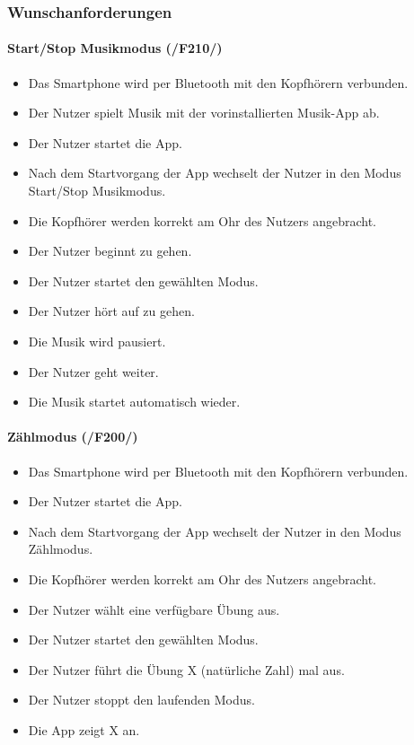 \documentclass[a4paper,12pt]{article}
\begin{document}
    \subsubsection{Wunschanforderungen}
      \paragraph{Start/Stop Musikmodus (/F210/)}
      \begin{itemize}
        \item[] Das Smartphone wird per Bluetooth mit den Kopfhörern verbunden.
        \item[] Der Nutzer spielt Musik mit der vorinstallierten Musik-App ab.
        \item[] Der Nutzer startet die App.
        \item[] Nach dem Startvorgang der App wechselt der Nutzer in den Modus \glqq Start/Stop Musikmodus\grqq .
        \item[] Die Kopfhörer werden korrekt am Ohr des Nutzers angebracht.
        \item[] Der Nutzer beginnt zu gehen.
        \item[] Der Nutzer startet den gewählten Modus.
        \item[] Der Nutzer hört auf zu gehen.
        \item[] Die Musik wird pausiert.
        \item[] Der Nutzer geht weiter.
        \item[] Die Musik startet automatisch wieder.
      \end{itemize}
      
      \paragraph{Zählmodus (/F200/)}
      \begin{itemize}
        \item[] Das Smartphone wird per Bluetooth mit den Kopfhörern verbunden.
        \item[] Der Nutzer startet die App.
        \item[] Nach dem Startvorgang der App wechselt der Nutzer in den Modus \glqq Zählmodus\grqq .
        \item[] Die Kopfhörer werden korrekt am Ohr des Nutzers angebracht.
        \item[] Der Nutzer wählt eine verfügbare Übung aus. 
        \item[] Der Nutzer startet den gewählten Modus.
        \item[] Der Nutzer führt die Übung X (natürliche Zahl) mal aus.
        \item[] Der Nutzer stoppt den laufenden Modus.
        \item[] Die App zeigt X an.
      \end{itemize}
\end{document}
